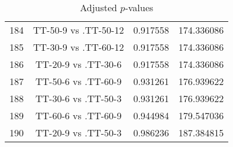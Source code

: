 \documentclass[a4paper,10pt]{article}
\begin{document}
\begin{landscape}
\begin{table}[!htp]
\begin{tabular}{cccc}
184&TT-50-9 vs .TT-50-12&0.917558&174.336086\\
185&TT-30-9 vs .TT-60-12&0.917558&174.336086\\
186&TT-20-9 vs .TT-30-6&0.917558&174.336086\\
187&TT-50-6 vs .TT-60-9&0.931261&176.939622\\
188&TT-30-6 vs .TT-50-3&0.931261&176.939622\\
189&TT-60-6 vs .TT-60-9&0.944984&179.547036\\
190&TT-20-9 vs .TT-50-3&0.986236&187.384815\\
\hline
\end{tabular}
\caption{Adjusted $p$-values}
\end{table}

\end{landscape}
\end{document}
